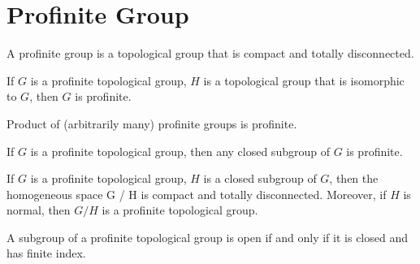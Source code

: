 %

\chapter{Profinite Group}

\begin{definition}
	\leanok
	A profinite group is a topological group that is compact and totally disconnected.
\end{definition}

\begin{lemma}
	\leanok
	If $G$ is a profinite topological group, $H$ is a topological group that is isomorphic to $G$, then $G$ is profinite.
\end{lemma}

\begin{lemma}
	Product of (arbitrarily many) profinite groups is profinite.
\end{lemma}

\begin{lemma}
	\leanok
	If $G$ is a profinite topological group, then any closed subgroup of $G$ is profinite.
\end{lemma}

\begin{lemma}
	If $G$ is a profinite topological group, $H$ is a closed subgroup of $G$, then the homogeneous space G / H is compact and totally disconnected. Moreover, if $H$ is normal, then $G / H$ is a profinite topological group.
\end{lemma}

\begin{lemma}
	A subgroup of a profinite topological group is open if and only if it is closed and has finite index.
\end{lemma}

